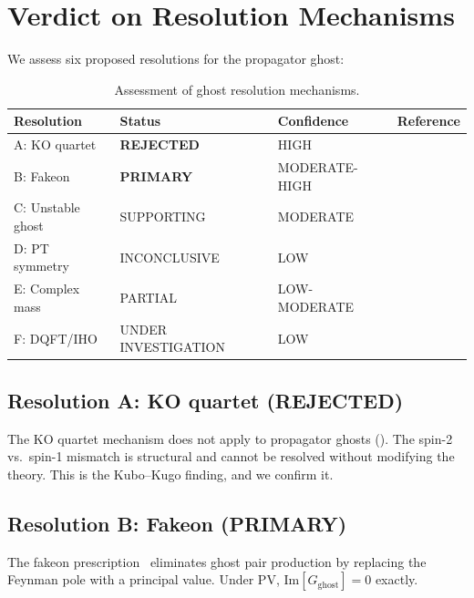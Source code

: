 \documentclass[11pt,a4paper]{article}
\newcommand{\Imag}{\mathrm{Im}}
\begin{document}
\section{Verdict on Resolution Mechanisms}
\label{sec:verdict}

We assess six proposed resolutions for the propagator ghost:

\begin{table}[htb]
\centering
\caption{Assessment of ghost resolution mechanisms.}
\label{tab:verdict}
\begin{tabular}{llll}
\toprule
Resolution & Status & Confidence & Reference \\
\midrule
A: KO quartet & \textbf{REJECTED} & HIGH & \cite{KuboKugo2023} \\
B: Fakeon & \textbf{PRIMARY} & MODERATE-HIGH & \cite{Anselmi2017,Anselmi2018} \\
C: Unstable ghost & SUPPORTING & MODERATE & \cite{DonoghueM2019} \\
D: PT symmetry & INCONCLUSIVE & LOW & \cite{Mannheim2018} \\
E: Complex mass & PARTIAL & LOW-MODERATE & \cite{Buoninfante2025} \\
F: DQFT/IHO & UNDER INVESTIGATION & LOW & \cite{Oda2024} \\
\bottomrule
\end{tabular}
\end{table}

\subsection{Resolution A: KO quartet (REJECTED)}

The KO quartet mechanism does not apply to propagator ghosts
().  The spin-2 vs.\ spin-1 mismatch
is structural and cannot be resolved without modifying the theory.
This is the Kubo--Kugo finding, and we confirm it.

\subsection{Resolution B: Fakeon (PRIMARY)}

The fakeon prescription~\cite{Anselmi2017,Anselmi2018} eliminates
ghost pair production by replacing the Feynman pole with a principal
value.  Under PV, $\Imag[G_{\text{ghost}}] = 0$ exactly.
\end{document}
